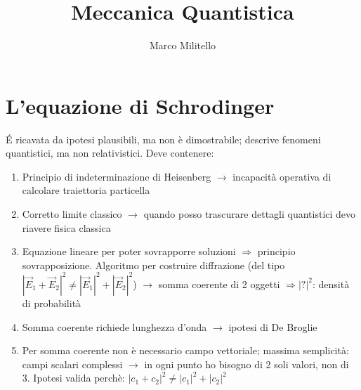 \documentclass[a4paper,11pt]{report}
\theoremstyle{remark}
\theoremstyle{definition}
\begin{document}
    \pagecolor{black}
    \color{white}

	\date{}
	\author{Marco Militello}
	\title{Meccanica Quantistica}
	\maketitle
	\tableofcontents
	\newpage
	




\chapter{L'equazione di Schrodinger}
\'E ricavata da ipotesi plausibili, ma non è dimostrabile; descrive fenomeni quantistici, ma non relativistici. \newline
Deve contenere: 
\begin{enumerate}
    \item Principio di indeterminazione di Heisenberg $\rightarrow$ incapacità operativa di calcolare traiettoria particella
    \item Corretto limite classico $\rightarrow$ quando posso trascurare dettagli quantistici devo riavere fisica classica
    \item Equazione lineare per poter sovrapporre soluzioni $\Rightarrow$ principio sovrapposizione. Algoritmo per costruire diffrazione (del tipo ${|\vec{E}_1 + \vec{E}_2|}^2 \neq {|\vec{E}_1|}^2 + {|\vec{E}_2|}^2$) $\rightarrow$ somma coerente di 2 oggetti $\Rightarrow {|?|}^2$: densità di probabilità
    \item Somma coerente richiede lunghezza d'onda $\rightarrow$ ipotesi di De Broglie
    \item Per somma coerente non è necessario campo vettoriale; massima semplicità: campi scalari complessi $\rightarrow$ in ogni punto ho bisogno di 2 soli valori, non di 3. Ipotesi valida perchè: ${|c_1 + c_2|}^2 \neq {|c_1|}^2 + {|c_2|}^2$
\end{enumerate}
\end{document}
